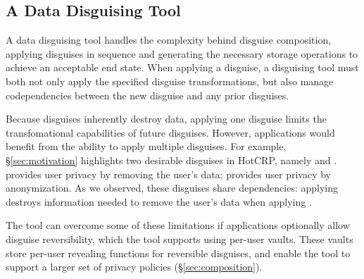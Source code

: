 \subsection{A Data Disguising Tool}
\label{sec:tool}

A data disguising tool handles the complexity behind disguise composition, applying disguises in
sequence and generating the necessary storage operations to achieve an acceptable end state.  When
applying a disguise, a disguising tool must both not only apply the specified disguise
transformations, but also manage codependencies between the new disguise and any prior disguises. 

Because disguises inherently destroy data, applying one disguise limits the transfomational
capabilities of future disguises. However, applications would benefit from the ability to apply
multiple disguises. For example, \S\ref{sec:motivation} highlights two desirable disguises in
HotCRP, namely \gdpr and \ca. \gdpr provides user privacy by removing the user's data; \ca provides
user privacy by anonymization.  As we observed, these disguises share dependencies: applying \ca
destroys information needed to remove the user's data when applying \gdpr.

The tool can overcome some of these limitations if applications optionally allow disguise reversibility,
which the tool supports using per-user vaults. These vaults store per-user revealing functions for
reversible disguises, and enable the tool to support a larger set of privacy policies
(\S\ref{sec:composition}).



